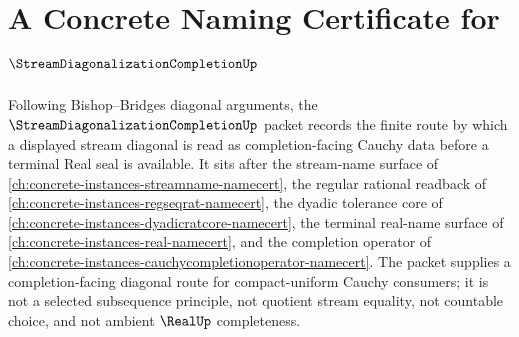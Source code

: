 \chapter{A Concrete Naming Certificate for $\StreamDiagonalizationCompletionUp$}
\label{ch:concrete-instances-stream-diagonalization-completion-namecert}

Following Bishop--Bridges diagonal arguments, the $\StreamDiagonalizationCompletionUp$ packet records the finite route by which a displayed stream diagonal is read as completion-facing Cauchy data before a terminal Real seal is available. It sits after the stream-name surface of \autoref{ch:concrete-instances-streamname-namecert}, the regular rational readback of \autoref{ch:concrete-instances-regseqrat-namecert}, the dyadic tolerance core of \autoref{ch:concrete-instances-dyadicratcore-namecert}, the terminal real-name surface of \autoref{ch:concrete-instances-real-namecert}, and the completion operator of \autoref{ch:concrete-instances-cauchycompletionoperator-namecert}. The packet supplies a completion-facing diagonal route for compact-uniform Cauchy consumers; it is not a selected subsequence principle, not quotient stream equality, not countable choice, and not ambient $\RealUp$ completeness.

